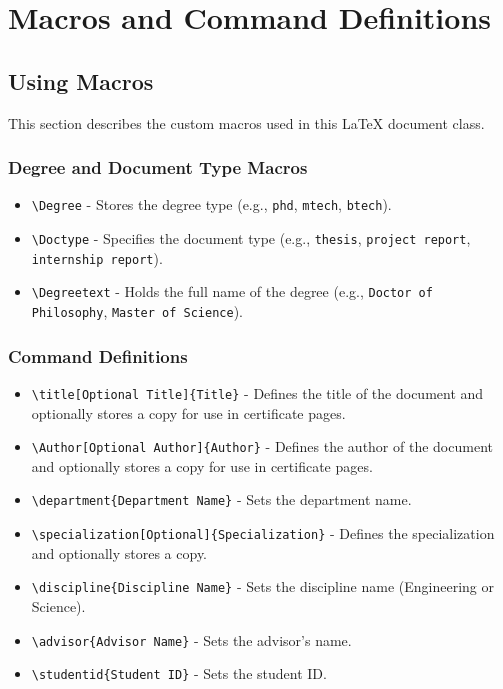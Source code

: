 \chapter{Macros and Command Definitions}\label{ch:macros}
\graphicspath{{figures/chapter_1/}} %
\section{Using Macros}
This section describes the custom macros used in this LaTeX document class.

\subsection{Degree and Document Type Macros}
\begin{itemize}
	\item \texttt{\textbackslash Degree} - Stores the degree type (e.g., \texttt{phd}, \texttt{mtech}, \texttt{btech}).
	\item \texttt{\textbackslash Doctype} - Specifies the document type (e.g., \texttt{thesis}, \texttt{project report}, \texttt{internship report}).
	\item \texttt{\textbackslash Degreetext} - Holds the full name of the degree (e.g., \texttt{Doctor of Philosophy}, \texttt{Master of Science}).
\end{itemize}

\subsection{Command Definitions}
\begin{itemize}
	\item \texttt{\textbackslash title[Optional Title]\{Title\}} - Defines the title of the document and optionally stores a copy for use in certificate pages.
	\item \texttt{\textbackslash Author[Optional Author]\{Author\}} - Defines the author of the document and optionally stores a copy for use in certificate pages.
	\item \texttt{\textbackslash department\{Department Name\}} - Sets the department name.
	\item \texttt{\textbackslash specialization[Optional]\{Specialization\}} - Defines the specialization and optionally stores a copy.
	\item \texttt{\textbackslash discipline\{Discipline Name\}} - Sets the discipline name (Engineering or Science).
	\item \texttt{\textbackslash advisor\{Advisor Name\}} - Sets the advisor's name.
	\item \texttt{\textbackslash studentid\{Student ID\}} - Sets the student ID.
\end{itemize}


